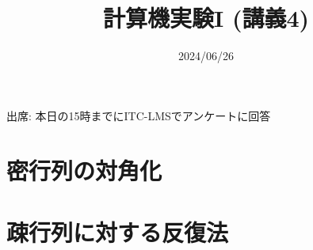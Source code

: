 \documentclass[10pt,dvipdfmx]{beamer}
\title{計算機実験I (講義4)}
\date{2024/06/26}
\begin{document}
\begin{frame}
  \titlepage
  \tableofcontents
  出席: 本日の15時までにITC-LMSでアンケートに回答
\end{frame}

\section{密行列の対角化}


%

%











%


\section{疎行列に対する反復法}

%











% 
% 





\section{}

\end{document}
